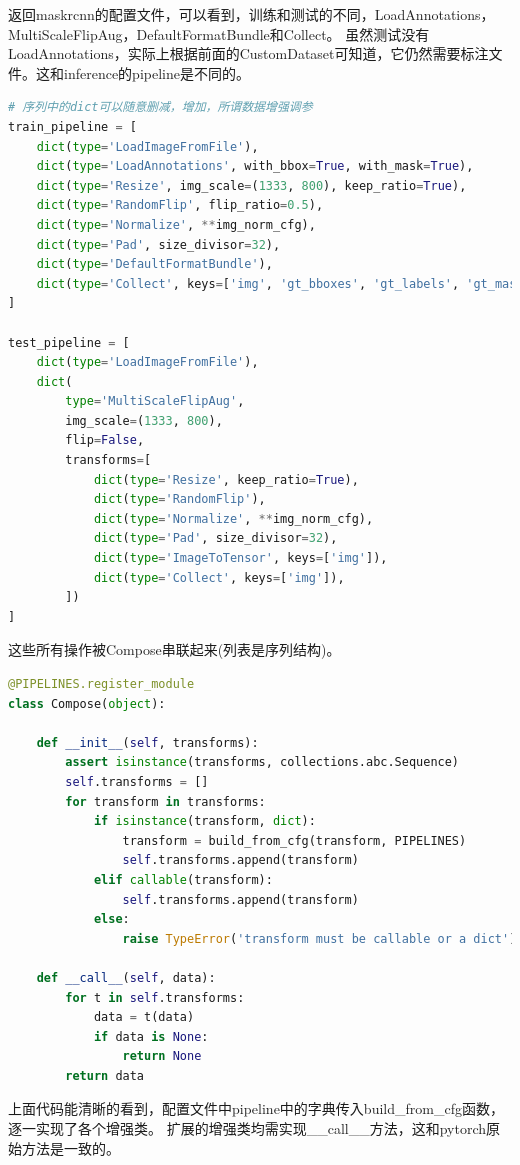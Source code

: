 \documentclass[UTF8]{ctexart}
\begin{document}
返回maskrcnn的配置文件，可以看到，训练和测试的不同，LoadAnnotations，MultiScaleFlipAug，DefaultFormatBundle和Collect。
虽然测试没有LoadAnnotations，实际上根据前面的CustomDataset可知道，它仍然需要标注文件。这和inference的pipeline是不同的。

\lstset{style=mystyle}
\begin{lstlisting}[language=Python]
# 序列中的dict可以随意删减，增加，所谓数据增强调参
train_pipeline = [
    dict(type='LoadImageFromFile'),
    dict(type='LoadAnnotations', with_bbox=True, with_mask=True),
    dict(type='Resize', img_scale=(1333, 800), keep_ratio=True),
    dict(type='RandomFlip', flip_ratio=0.5),
    dict(type='Normalize', **img_norm_cfg),
    dict(type='Pad', size_divisor=32),
    dict(type='DefaultFormatBundle'),
    dict(type='Collect', keys=['img', 'gt_bboxes', 'gt_labels', 'gt_masks']),
]

test_pipeline = [
    dict(type='LoadImageFromFile'),
    dict(
        type='MultiScaleFlipAug',
        img_scale=(1333, 800),
        flip=False,
        transforms=[
            dict(type='Resize', keep_ratio=True),
            dict(type='RandomFlip'),
            dict(type='Normalize', **img_norm_cfg),
            dict(type='Pad', size_divisor=32),
            dict(type='ImageToTensor', keys=['img']),
            dict(type='Collect', keys=['img']),
        ])
]
\end{lstlisting}
这些所有操作被Compose串联起来(列表是序列结构)。

\lstset{style=mystyle}
\begin{lstlisting}[language=Python]
@PIPELINES.register_module
class Compose(object):

	def __init__(self, transforms):
		assert isinstance(transforms, collections.abc.Sequence)
		self.transforms = []
		for transform in transforms:
			if isinstance(transform, dict):
				transform = build_from_cfg(transform, PIPELINES)
				self.transforms.append(transform)
			elif callable(transform):
				self.transforms.append(transform)
			else:
				raise TypeError('transform must be callable or a dict')

	def __call__(self, data):
		for t in self.transforms:
			data = t(data)
			if data is None:
				return None
		return data
\end{lstlisting}
上面代码能清晰的看到，配置文件中pipeline中的字典传入build\_from\_cfg函数，逐一实现了各个增强类。
扩展的增强类均需实现\_\_call\_\_方法，这和pytorch原始方法是一致的。
\end{document}
